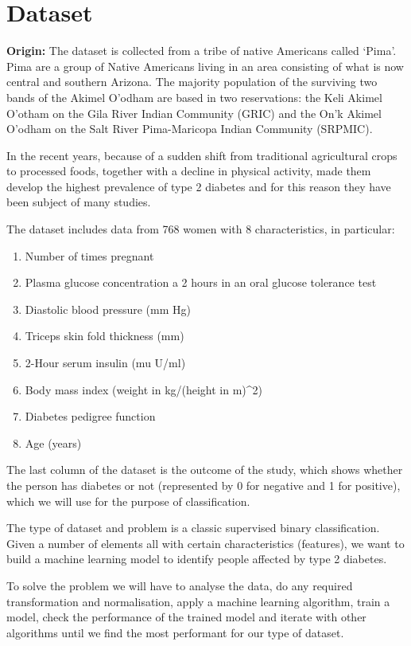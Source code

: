 \documentclass{article}
\begin{document}
\section{Dataset}

\textbf{Origin:} The dataset is collected from a tribe of native Americans called `Pima'. Pima are a group of Native Americans living in an area consisting of what is now central and southern Arizona. The majority population of the surviving two bands of the Akimel O'odham are based in two reservations: the Keli Akimel O'otham on the Gila River Indian Community (GRIC) and the On'k Akimel O'odham on the Salt River Pima-Maricopa Indian Community (SRPMIC).
\par In the recent years, because of a sudden shift from traditional agricultural crops to processed foods, together with a decline in physical activity, made them develop the highest prevalence of type 2 diabetes and for this reason they have been subject of many studies.
\par The dataset includes data from 768 women with 8 characteristics, in particular:
\begin{enumerate}
	\item Number of times pregnant
	\item Plasma glucose concentration a 2 hours in an oral glucose tolerance test
	\item Diastolic blood pressure (mm Hg)
	\item Triceps skin fold thickness (mm)
	\item 2-Hour serum insulin (mu U/ml)
	\item Body mass index (weight in kg/(height in m)\textasciicircum2)
	\item Diabetes pedigree function
	\item Age (years)
\end{enumerate}
The last column of the dataset is the outcome of the study, which shows whether the person has diabetes or not (represented by 0 for negative and 1 for positive), which we will use for the purpose of classification.

\par The type of dataset and problem is a classic supervised binary classification. Given a number of elements all with certain characteristics (features), we want to build a machine learning model to identify people affected by type 2 diabetes.

To solve the problem we will have to analyse the data, do any required transformation and normalisation, apply a machine learning algorithm, train a model, check the performance of the trained model and iterate with other algorithms until we find the most performant for our type of dataset.
\end{document}
